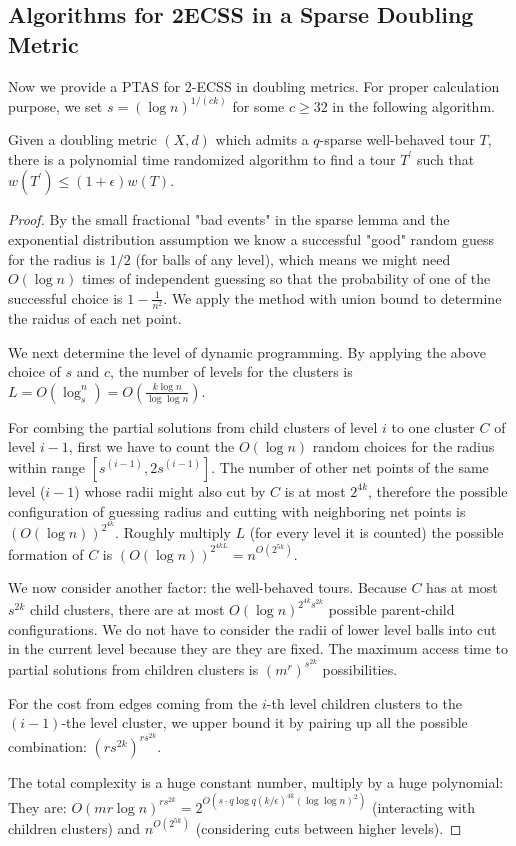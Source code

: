 \documentclass{llncs}
\begin{document}
\subsection{Algorithms for 2ECSS in a Sparse Doubling Metric}

Now we provide a PTAS for 2-ECSS in doubling metrics.
For proper calculation purpose, we set $s=(\log n)^{1/(ck)}$ for some $c\geq 32$ in the following algorithm.
\begin{theorem}\label{longshort}
Given a doubling metric $(X,d)$ which admits a $q$-sparse well-behaved tour $T$, there is a polynomial time randomized algorithm to find a tour $T^\prime$ such that $w(T^\prime)\leq(1+\epsilon)w(T)$.
\end{theorem}

\begin{proof}
By the small fractional "bad events" in the sparse lemma and the exponential distribution assumption we know a successful "good" random guess for the radius is $1/2$ (for balls of any level), which means we might need $O(\log n)$ times of independent guessing so that the probability of one of the successful choice is $1-\frac{1}{n^2}$. We apply the method with union bound to determine the raidus of each net point.

We next determine the level of dynamic programming.
By applying the above choice of $s$ and $c$, the number of levels for the clusters is $L=O(\log_s^n)=O(\frac{k\log n}{\log\log n})$.

For combing the partial solutions from child clusters of level $i$ to one cluster $C$ of level $i-1$, first we have to count the $O(\log n)$ random choices for the radius within range $[s^{(i-1)},2s^{(i-1)}]$.
The number of other net points of the same level ($i-1$) whose radii might also cut by $C$ is at most $2^{4k}$, therefore the possible configuration of guessing radius and cutting with neighboring net points is $(O(\log n))^{2^{4k}}$.
Roughly multiply $L$ (for every level it is counted) the possible formation of $C$ is $(O(\log n))^{2^{4kL}}=n^{O(2^{5k})}$.

We now consider another factor: the well-behaved tours. 
Because $C$ has at most $s^{2k}$ child clusters, there are at most ${O(\log n)}^{2^{4k}{s^{2k}}}$ possible parent-child configurations.
We do not have to consider the radii of lower level balls into cut in the current level because they are they are fixed.
The maximum access time to partial solutions from children clusters is $(m^r)^{s^{2k}}$ possibilities.

For the cost from edges coming from the $i$-th level children clusters to the $(i-1)$-the level cluster, we upper bound it by pairing up all the possible combination: $(rs^{2k})^{rs^{2k}}$.

The total complexity is a huge constant number, multiply by a huge polynomial:
They are: $O(mr\log n)^{rs^{2k}}=2^{O(s\cdot q\log q(k/\epsilon)^{4k}(\log\log n)^2)}$ (interacting with children clusters) and $n^{O(2^{5k})}$ (considering cuts between higher levels).
\end{proof}
\end{document}
